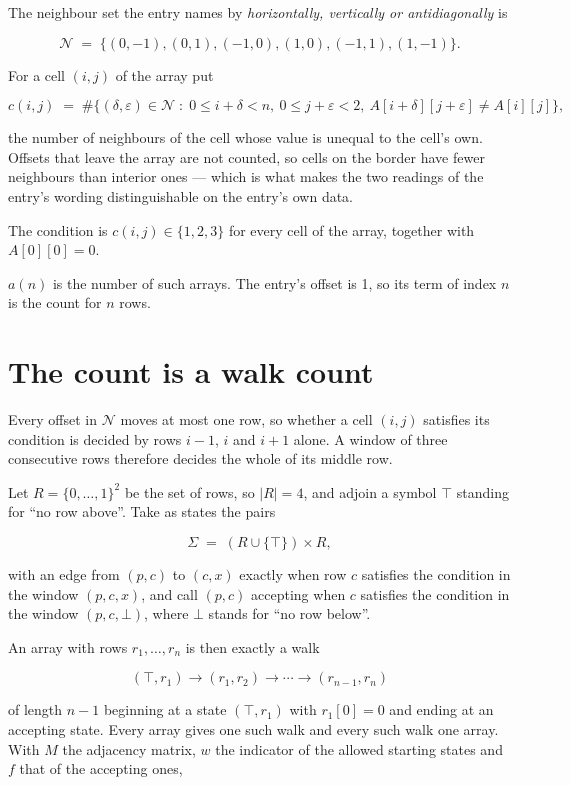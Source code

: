 \documentclass[11pt]{article}
\theoremstyle{definition}
\begin{document}
The neighbour set the entry names by {\itshape horizontally, vertically or antidiagonally} is

\[\mathcal{N} \;=\; \{(0,-1), (0,1), (-1,0), (1,0), (-1,1), (1,-1)\}.\]

For a cell $(i,j)$ of the array put

\[c(i,j) \;=\; \#\bigl\{(\delta,\varepsilon)\in\mathcal{N} \;:\; 0\le i+\delta<n,\ 0\le j+\varepsilon<2,\ A[i+\delta][j+\varepsilon] \neq A[i][j]\bigr\},\]

the number of neighbours of the cell whose value is unequal to the cell's own. Offsets that leave the array are not counted, so cells on the border have fewer neighbours than interior ones --- which is what makes the two readings of the entry's wording distinguishable on the entry's own data.

The condition is $c(i,j) \in \{1, 2, 3\}$ for every cell of the array, together with $A[0][0]=0$.

$a(n)$ is the number of such arrays. The entry's offset is 1, so its term of index $n$ is the count for $n$ rows.

\section{The count is a walk count}

Every offset in $\mathcal{N}$ moves at most one row, so whether a cell $(i,j)$ satisfies its condition is decided by rows $i-1$, $i$ and $i+1$ alone. A window of three consecutive rows therefore decides the whole of its middle row.

Let $R = \{0,\dots,1\}^{2}$ be the set of rows, so $|R| = 4$, and adjoin a symbol $\top$ standing for ``no row above''. Take as states the pairs

\[\Sigma \;=\; (R \cup \{\top\}) \times R,\]

with an edge from $(p,c)$ to $(c,x)$ exactly when row $c$ satisfies the condition in the window $(p,c,x)$, and call $(p,c)$ accepting when $c$ satisfies the condition in the window $(p,c,\bot)$, where $\bot$ stands for ``no row below''.

An array with rows $r_1,\dots,r_n$ is then exactly a walk

\[(\top,r_1) \to (r_1,r_2) \to \cdots \to (r_{n-1},r_n)\]

of length $n-1$ beginning at a state $(\top,r_1)$ with $r_1[0]=0$ and ending at an accepting state. Every array gives one such walk and every such walk one array. With $M$ the adjacency matrix, $w$ the indicator of the allowed starting states and $f$ that of the accepting ones,
\end{document}
